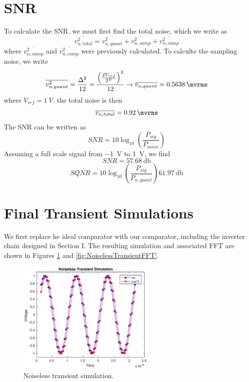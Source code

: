 \documentclass[letterpaper, notitlepage]{revtex4-1}
\begin{document}
\section{SNR}
To calculate the SNR, we must first find the total noise, which we write as
\begin{equation}
\overline{v_{n,total}^2}=\overline{v_{n,quant}^2}+\overline{v_{n,samp}^2}+\overline{v_{n,comp}^2}
\end{equation}
where $\overline{v_{n,samp}^2}$ and $\overline{v_{n,comp}^2}$ were previously calculated. To calculte the sampling noise, we write
\begin{equation}
\overline{v_{n,quant}^2}=\frac{\Delta^2}{12}=\frac{\left(\frac{2V_{ref}}{2^B}\right)^2}{12}\rightarrow\overline{v_{n,quant}}=\SI{0.5638}{\mvrms}
\end{equation}
where $V_{ref}=\SI{1}{V}$. the total noise is then
\begin{equation}
\overline{v_{n,total}}=\SI{0.92}{\mvrms}
\end{equation}
The SNR can be written as
\begin{equation}
SNR=10\log_{10}\left(\frac{P_{sig}}{P_{noise}}\right)
\end{equation}
Assuming a full scale signal from \SI{-1}{\volt} to \SI{1}{\volt}, we find
\begin{equation}
SNR=\SI{57.68}{\decibel}
\end{equation}
\begin{equation}
SQNR=10\log_{10}\left(\frac{P_{sig}}{P_{n,quant}}\right)\SI{61.97}{\decibel}
\end{equation}

\section{Final Transient Simulations}

We first replace he ideal comparator with our comparator, including the inverter chain designed in Section I. The resulting simulation and associated FFT are shown in Figures \ref{fig:NoiselessTransient} and \ref{fig:NoiselessTransientFFT}.
\begin{figure}[h]
\begin{center}
\includegraphics[width=0.6\textwidth]{noiseless_transient_sig.eps}
\caption{Noiseless transient simulation.}
\label{fig:NoiselessTransient}
\end{center}
\end{figure}
\end{document}
